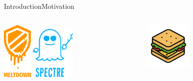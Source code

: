 \documentclass[aspectratio=169, hyperref={colorlinks=true, allcolors=SecondaryColor}, c]{beamer}
\begin{document}
\begin{frame}[fragile]{Introduction}{Motivation}
	\begin{columns}
		\begin{column}[t]{0.5\textwidth}
			\begin{center}
        \includegraphics[width=0.2\textwidth]{./figures/meltdown.png}\hspace{0.4cm}\cite{MeltdownSecurityVulnerability2024}
				\hspace{0.5cm}
        \includegraphics[width=0.3\textwidth]{./figures/spectre.png}\cite{SpectreSecurityVulnerability2025}
			\end{center}
		\end{column}
		\begin{column}[t]{0.5\textwidth}
			\begin{center}
				\includegraphics[width=0.4\textwidth]{./figures/sandwich_alpha.png}
			\end{center}
		\end{column}

\end{columns}
\end{frame}
\end{document}
